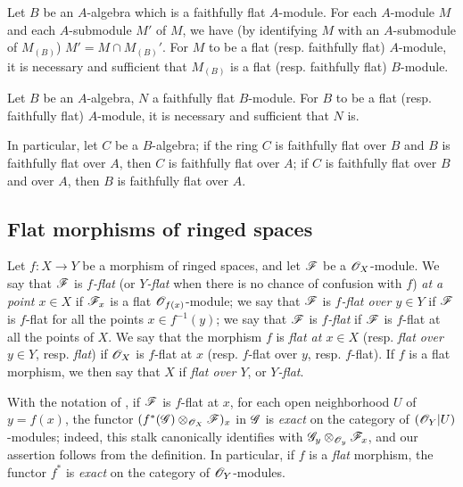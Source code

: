 \begin{env}[6.6.3]
\label{0.6.6.3}
Let $B$ be an $A$-algebra which is a faithfully flat $A$-module. For each $A$-module $M$ and
each $A$-submodule $M'$ of $M$, we have (by identifying $M$ with an $A$-submodule of
$M_{(B)}$) $M'=M\cap M_{(B)}'$. For $M$ to be a flat (resp. faithfully flat) $A$-module, it
is necessary and sufficient that $M_{(B)}$ is a flat (resp. faithfully flat) $B$-module.
\end{env}

\begin{env}[6.6.4]
\label{0.6.6.4}
Let $B$ be an $A$-algebra, $N$ a faithfully flat $B$-module. For $B$ to be a flat
(resp. faithfully flat) $A$-module, it is necessary and sufficient that $N$ is.

In particular, let $C$ be a $B$-algebra; if the ring $C$ is faithfully flat over $B$ and $B$
is faithfully flat over $A$, then $C$ is faithfully flat over $A$; if $C$ is faithfully flat
over $B$ and over $A$, then $B$ is faithfully flat over $A$.
\end{env}

\subsection{Flat morphisms of ringed spaces}
\label{subsection:0.6.7}

\begin{env}[6.7.1]
\label{0.6.7.1}
Let $f:X\to Y$ be a morphism of ringed spaces, and let $\mathscr{F}$ be a $\mathscr{O}_X$-module. We say
that $\mathscr{F}$ is \emph{$f$-flat} (or \emph{$Y$-flat} when there is no chance of confusion
with $f$) \emph{at a point $x\in X$} if $\mathscr{F}_x$ is a flat $\mathscr{O}_{f(x)}$-module; we say that
$\mathscr{F}$ is \emph{$f$-flat over $y\in Y$} if $\mathscr{F}$ is $f$-flat for all the points
$x\in f^{-1}(y)$; we say that $\mathscr{F}$ is \emph{$f$-flat} if $\mathscr{F}$ is $f$-flat at all the
points of $X$. We say that the morphism $f$ is \emph{flat at $x\in X$} (resp. \emph{flat over
$y\in Y$}, resp. \emph{flat}) if $\mathscr{O}_X$ is $f$-flat at $x$ (resp. $f$-flat over $y$, resp.
$f$-flat). If $f$ is a flat morphism, we then say that $X$ if \emph{flat over $Y$}, or
\emph{$Y$-flat}.
\end{env}

\begin{env}[6.7.2]
\label{0.6.7.2}
With the notation of , if $\mathscr{F}$ is $f$-flat at $x$, for each open
neighborhood $U$ of $y=f(x)$, the functor $(f^*(\mathscr{G})\otimes_{\mathscr{O}_X}\mathscr{F})_x$ in $\mathscr{G}$
is \emph{exact} on the category of $(\mathscr{O}_Y|U)$-modules; indeed, this stalk canonically
identifies with $\mathscr{G}_y\otimes_{\mathscr{O}_y}\mathscr{F}_x$, and our assertion follows from the
definition. In particular, if $f$ is a \emph{flat} morphism, the functor $f^*$ is
\emph{exact} on the category of $\mathscr{O}_Y$-modules.
\end{env}

